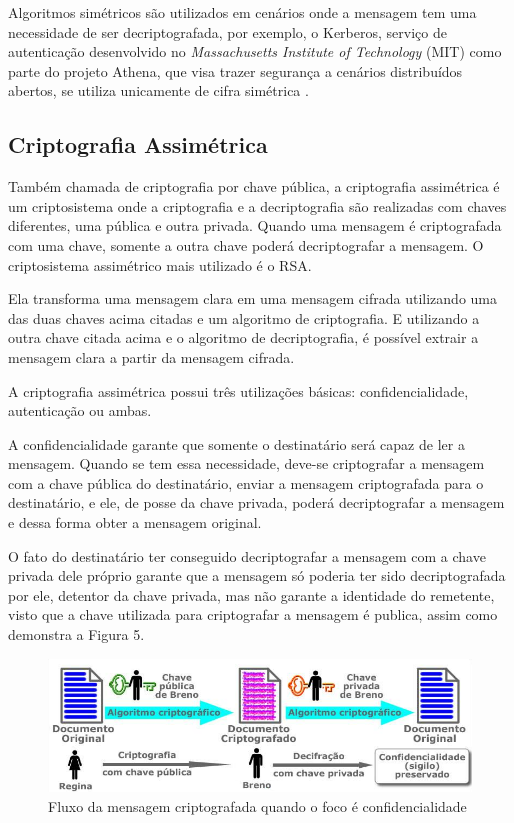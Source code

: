 Algoritmos simétricos são utilizados em cenários onde a mensagem tem uma necessidade de ser decriptografada, por exemplo, o Kerberos, serviço de autenticação desenvolvido no \textit{Massachusetts Institute of Technology} (MIT) como parte do projeto Athena, que visa trazer segurança a cenários distribuídos abertos, se utiliza unicamente de cifra simétrica \cite{stallings14}.

\subsection{Criptografia Assimétrica}
\label{subsec:criptografiaasync}
Também chamada de criptografia por chave pública, a criptografia assimétrica é um criptosistema onde a criptografia e a decriptografia são realizadas com chaves diferentes, uma pública e outra privada. Quando uma mensagem é criptografada com uma chave, somente a outra chave poderá decriptografar  a mensagem. O criptosistema assimétrico mais utilizado é o RSA.

Ela transforma uma mensagem clara em uma mensagem cifrada utilizando uma das duas chaves acima citadas e um algoritmo de criptografia. E utilizando a outra chave citada acima e o algoritmo de decriptografia, é possível extrair a mensagem clara a partir da mensagem cifrada.

A criptografia assimétrica possui três utilizações básicas: confidencialidade, autenticação ou ambas.

A confidencialidade garante que somente o destinatário será capaz de ler a mensagem. Quando se tem essa necessidade, deve-se criptografar a mensagem com a chave pública do destinatário, enviar a mensagem criptografada para o destinatário, e ele, de posse da chave privada, poderá decriptografar a mensagem e dessa forma obter a mensagem original.

O fato do destinatário ter conseguido decriptografar a mensagem com a chave privada dele próprio garante que a mensagem só poderia ter sido decriptografada por ele, detentor da chave privada, mas não garante a identidade do remetente, visto que a chave utilizada para criptografar a mensagem é publica, assim como demonstra a Figura 5.

\begin{figure}[H]
    \centering
    \caption{Fluxo da mensagem criptografada quando o foco é confidencialidade}
    \includegraphics[width=.8\linewidth]{Figuras/Confidencialidade.png}
\end{figure}

